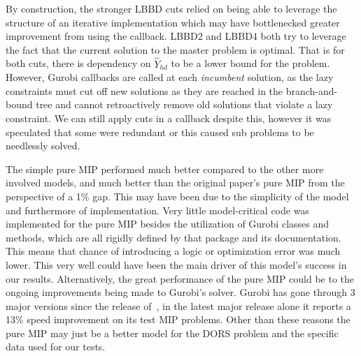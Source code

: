 By construction, the stronger LBBD cuts relied on being able to leverage the structure of an iterative implementation which may have bottlenecked greater improvement from using the callback. LBBD2 and LBBD4 both try to leverage the fact that the current solution to the master problem is optimal. That is for both cuts, there is dependency on $\hat{Y}_{hd}$ to be a lower bound for the problem. However, Gurobi callbacks are called at each \textit{incumbent} solution, as the lazy constraints must cut off new solutions as they are reached in the branch-and-bound tree and cannot retroactively remove old solutions that violate a lazy constraint. We can still apply cuts in a callback despite this, however it was speculated that some were redundant or this caused sub problems to be needlessly solved. 



The simple pure MIP performed much better compared to the other more involved models, and much better than the original paper's pure MIP from the perspective of a 1\% gap. This may have been due to the simplicity of the model and furthermore of implementation. Very little model-critical code was implemented for the pure MIP besides the utilization of Gurobi classes and methods, which are all rigidly defined by that package and its documentation. This means that chance of introducing a logic or optimization error was much lower. This very well could have been the main driver of this model's success in our results. Alternatively, the great performance of the pure MIP could be to the ongoing improvements being made to Gurobi's solver. Gurobi has gone through 3 major versions since the release of~\cite{roshanaei2017propagating},  in the latest major release alone it reports a 13\% speed improvement on its test MIP problems\cite{gurobiBragging}. Other than these reasons the pure MIP may just be a better model for the DORS problem and the specific data used for our tests. 